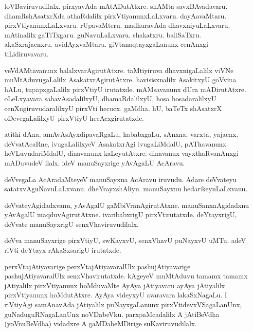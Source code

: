 \documentclass{article}
\begin{document}
\begin{mng}%
loVBaviruvudilalx. pirxyavAda mAtADutAtxre. shAMta savxBAvadavaru. dhamRshAsatxrXda athaRdalilx 
pirxVtiyanunxLaLxvaru. dayAavaMtaru. pirxVtiyanunxLaLxvaru. rUpavaMteru. madhuravAda 
dhavxniyuLaLxvaru. mAtinalilx gaTiTxgaru. guNavuLaLxvaru. shakatxru. baliSaTxru. akaSxrajacnxru. 
avidAyxvaMtaru. giVtanaqtayxgaLanunx cenAnxgi tiLidiruvavaru.
\end{mng}

\begin{mng}%
veVdAMtavanunx balalxvarAgirutAtxre. taMtiyiruva dhavxnigaLalilx viVNe muMtAduvugaLalilx 
AsakatxrAgirutAtxre. havisisxnalilx AsakitxyU goVvina hALu, tupapxgaLalilx pirxVtiyU irutatxde. 
mAMsavanunx dUra mADirutAtxre. oLeLxyavara sahavAsadalilxyU, dhamaRdalilxyU, hosa hosadaralilxyU 
cenXngiruvudaralilxyU pirxVti hecucx. gaMdha, hU, baTeTx shAsatxrX oDevegaLalilxyU pirxVtiyU 
hecAcxgirutatxde.
\end{mng}

\begin{mng}%
atithi dAna, amAvAsAyxdipavaRgaLu, hababxgaLu, sAnxna, varxta, yajacnx, deVvatAcaRne, 
ivugaLalilxyeV AsakatxrAgi ivugaLiMdalU, pAThavanunx heVLuvudariMdalU, dinavanunx kaLeyutAtxre. 
dinavanux vayxthaRvanAnxgi mADuvudeV ilalx. ideV manuSayxrige yAvAgaLU AcAravu.
\end{mng}

\begin{mng}%
deVvegaLa AcAradaMteyeV manuSayxna AcAravu iruvudu. Adare deVvateyu satatxvAguNavuLaLxvanu. 
dheYrayxshAliyu. manuSayxnu hedarikeyuLaLxvanu.
\end{mng}

\begin{mng}%
deVvateyAgidadxvanu, yAvAgalU gaMbiVranAgirutAtxne. manuSanxnAgidadxnu yAvAgalU maqduvAgirutAtxne. 
ivaribabxrigU pirxVtirutatxde. deYtayxrigU, deVvate manuSayxrigU senxVhaviruvudilalx.
\end{mng}

\begin{mng}%
deVva manuSayxrige pirxVtiyU, swKayxvU, senxVhavU puNayxvU uMTu. adeV riVti deYtayx rAkaSxsarigU 
irutatxde.
\end{mng}

\begin{mng}%
perxVtajAtiyavarige perxVtajAtiyavaralUlx pashujAtiyavarige pashujAtiyavaralUlx senxVhavirutatxde. 
kAgeyeV muMtAduvu tamamx tamamx jAtiyalilx pirxVtiyanunx hoMduvaMte AyAya jAtiyavaru ayAya 
jAtiyalilx pirxVtiyanunx hoMdutAtxre. AyAya videyxyU avaravara lakaSxNagaLu. I riVtiyAgi 
samAnavAda jAtiyalilx puNayxgaLanunx pirxVtidevxVSagaLanUnx, guNaduguRNagaLanUnx noVDabeVku. 
parxpaMcadalilx A jAtiBeVdha (yoVnuBeVdha) vidadxre A gaMDaheMDirige suKaviruvudilalx. 
\end{mng}
\end{document}
